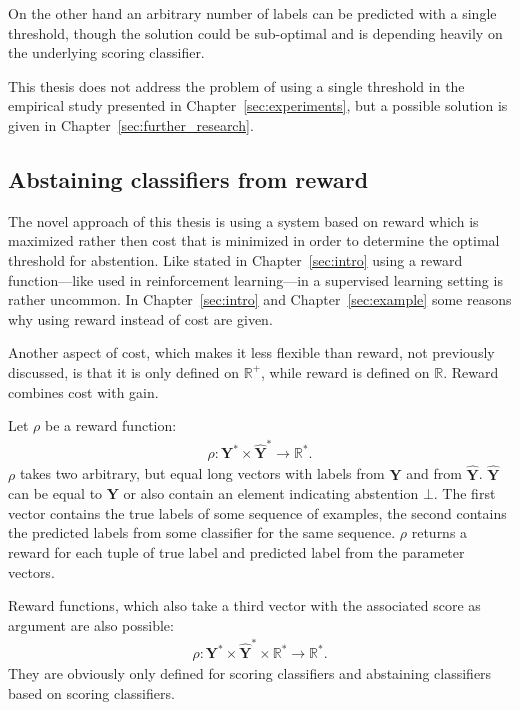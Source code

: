 \documentclass[twoside,11pt]{article}
\def\Y{\textbf{Y}}
\begin{document}
On the other hand an arbitrary number of labels can be
predicted with a single threshold, though the solution
could be sub-optimal and is depending heavily on the
underlying scoring classifier.

This thesis does not address the problem of using a single
threshold in the empirical
study presented in Chapter~\ref{sec:experiments}, but a
possible solution is given in
Chapter~\ref{sec:further_research}.

\subsection{Abstaining classifiers from reward}

The novel approach of this thesis is using a system based
on reward which is maximized rather then cost that is
minimized in order to determine the optimal threshold for
abstention.
Like stated in Chapter~\ref{sec:intro} using a reward
function---like used in reinforcement learning---in a
supervised learning setting is rather uncommon.
In Chapter~\ref{sec:intro} and Chapter~\ref{sec:example}
some reasons why using reward instead of cost are given.

Another aspect of cost, which makes it less flexible than
reward, not previously discussed, is that it is only
defined on $\mathbb{R}^+$, while reward is defined on
$\mathbb{R}$.
Reward combines cost with gain.

Let $\rho$ be a reward function:
\begin{align}
  \label{eq:rho}
  \rho: \Y^* \times \hat{\Y}^* \rightarrow \mathbb{R}^*.
\end{align}
$\rho$ takes two arbitrary, but equal long vectors with
labels from $\Y$ and from $\hat{\Y}$. $\hat{\Y}$ can be
equal to $\Y$ or also contain an element indicating
abstention $\bot$.
The first vector contains the true labels of some sequence
of examples, the second contains the predicted labels from
some classifier for the same sequence.
$\rho$ returns a reward for each tuple of true
label and predicted label from the parameter vectors.

Reward functions, which also take a third vector with the
associated score as argument are also possible:
\begin{align}
  \label{eq:rho2}
  \rho: \Y^* \times \hat{\Y}^* \times \mathbb{R}^*
        \rightarrow \mathbb{R}^*.
\end{align}
They are obviously only defined for scoring classifiers and
abstaining classifiers based on scoring classifiers.
\end{document}
